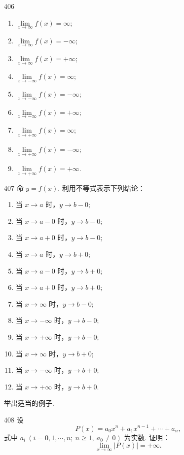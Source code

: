 \begin{prob}[L]{406}
\begin{enumerate}[label=(\alph*), itemsep=2pt, topsep=3pt]
  \item $\lim\limits_{x \to \infty} f(x) = \infty$;
  \item $\lim\limits_{x \to \infty} f(x) = -\infty$;
  \item $\lim\limits_{x \to \infty} f(x) = +\infty$;
  \item $\lim\limits_{x \to -\infty} f(x) = \infty$;
  \item $\lim\limits_{x \to -\infty} f(x) = -\infty$;
  \item $\lim\limits_{x \to -\infty} f(x) = +\infty$;
  \item $\lim\limits_{x \to +\infty} f(x) = \infty$;
  \item $\lim\limits_{x \to +\infty} f(x) = -\infty$;
  \item $\lim\limits_{x \to +\infty} f(x) = +\infty$.
\end{enumerate}
\end{prob}

\begin{prob}[L]{407}
命 $y = f(x)$. 利用不等式表示下列结论：
\begin{enumerate}[label=(\alph*), itemsep=2pt, topsep=3pt]
  \item 当 $x \to a$ 时，$y \to b - 0$;
  \item 当 $x \to a - 0$ 时，$y \to b - 0$;
  \item 当 $x \to a + 0$ 时，$y \to b - 0$;
  \item 当 $x \to a$ 时，$y \to b + 0$;
  \item 当 $x \to a - 0$ 时，$y \to b + 0$;
  \item 当 $x \to a + 0$ 时，$y \to b + 0$;
  \item 当 $x \to \infty$ 时，$y \to b - 0$;
  \item 当 $x \to -\infty$ 时，$y \to b - 0$;
  \item 当 $x \to +\infty$ 时，$y \to b - 0$;
  \item 当 $x \to \infty$ 时，$y \to b + 0$;
  \item 当 $x \to -\infty$ 时，$y \to b + 0$;
  \item 当 $x \to +\infty$ 时，$y \to b + 0$.
\end{enumerate}
举出适当的例子.
\end{prob}

\begin{prob}[M]{408}
设
\[
P(x) = a_0 x^n + a_1 x^{n-1} + \cdots + a_n,
\]
式中 $a_i\ (i = 0, 1, \cdots, n;\ n \geqslant 1,\ a_0 \neq 0)$ 为实数. 证明：
\[
\lim_{x \to \infty} |P(x)| = +\infty.
\]
\end{prob}

